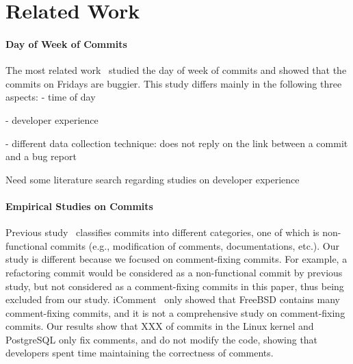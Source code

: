 \section{Related Work}
\label{sec-related}

\paragraph{Day of Week of Commits}
The most related work~\cite{sliwerski-msr-2005} studied the day of week of commits and
showed that the commits on Fridays are buggier. 
This study differs mainly in the following three aspects:
- time of day

- developer experience 

- different data collection technique: does not reply on the link between a commit and a bug report

Need some literature search regarding studies on developer experience

\paragraph{Empirical Studies on Commits}
Previous study~\cite{largeCommits} classifies commits into different categories, one of which 
is non-functional commits (e.g., modification of comments, documentations, etc.).
Our study is different because we focused on
comment-fixing commits. For example, a refactoring commit 
would be considered as a non-functional commit by previous study, but not considered as a comment-fixing commits in this paper, 
thus being excluded from our study. 
iComment~\cite{iComment} only showed that FreeBSD contains many comment-fixing commits, and it is 
not a comprehensive study on comment-fixing commits.  
Our results show that XXX of commits in the Linux kernel and PostgreSQL only fix comments, and do not modify the code, showing
that developers spent time maintaining the correctness of comments. 


